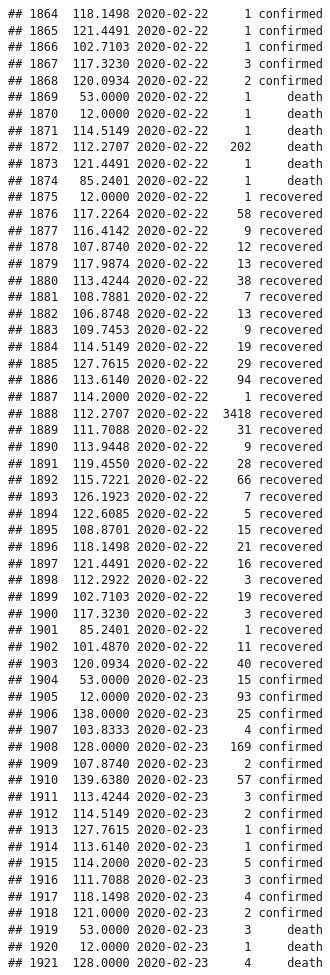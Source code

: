 \documentclass[
]{article}
\begin{document}
\begin{verbatim}
## 1864  118.1498 2020-02-22     1 confirmed
## 1865  121.4491 2020-02-22     1 confirmed
## 1866  102.7103 2020-02-22     1 confirmed
## 1867  117.3230 2020-02-22     3 confirmed
## 1868  120.0934 2020-02-22     2 confirmed
## 1869   53.0000 2020-02-22     1     death
## 1870   12.0000 2020-02-22     1     death
## 1871  114.5149 2020-02-22     1     death
## 1872  112.2707 2020-02-22   202     death
## 1873  121.4491 2020-02-22     1     death
## 1874   85.2401 2020-02-22     1     death
## 1875   12.0000 2020-02-22     1 recovered
## 1876  117.2264 2020-02-22    58 recovered
## 1877  116.4142 2020-02-22     9 recovered
## 1878  107.8740 2020-02-22    12 recovered
## 1879  117.9874 2020-02-22    13 recovered
## 1880  113.4244 2020-02-22    38 recovered
## 1881  108.7881 2020-02-22     7 recovered
## 1882  106.8748 2020-02-22    13 recovered
## 1883  109.7453 2020-02-22     9 recovered
## 1884  114.5149 2020-02-22    19 recovered
## 1885  127.7615 2020-02-22    29 recovered
## 1886  113.6140 2020-02-22    94 recovered
## 1887  114.2000 2020-02-22     1 recovered
## 1888  112.2707 2020-02-22  3418 recovered
## 1889  111.7088 2020-02-22    31 recovered
## 1890  113.9448 2020-02-22     9 recovered
## 1891  119.4550 2020-02-22    28 recovered
## 1892  115.7221 2020-02-22    66 recovered
## 1893  126.1923 2020-02-22     7 recovered
## 1894  122.6085 2020-02-22     5 recovered
## 1895  108.8701 2020-02-22    15 recovered
## 1896  118.1498 2020-02-22    21 recovered
## 1897  121.4491 2020-02-22    16 recovered
## 1898  112.2922 2020-02-22     3 recovered
## 1899  102.7103 2020-02-22    19 recovered
## 1900  117.3230 2020-02-22     3 recovered
## 1901   85.2401 2020-02-22     1 recovered
## 1902  101.4870 2020-02-22    11 recovered
## 1903  120.0934 2020-02-22    40 recovered
## 1904   53.0000 2020-02-23    15 confirmed
## 1905   12.0000 2020-02-23    93 confirmed
## 1906  138.0000 2020-02-23    25 confirmed
## 1907  103.8333 2020-02-23     4 confirmed
## 1908  128.0000 2020-02-23   169 confirmed
## 1909  107.8740 2020-02-23     2 confirmed
## 1910  139.6380 2020-02-23    57 confirmed
## 1911  113.4244 2020-02-23     3 confirmed
## 1912  114.5149 2020-02-23     2 confirmed
## 1913  127.7615 2020-02-23     1 confirmed
## 1914  113.6140 2020-02-23     1 confirmed
## 1915  114.2000 2020-02-23     5 confirmed
## 1916  111.7088 2020-02-23     3 confirmed
## 1917  118.1498 2020-02-23     4 confirmed
## 1918  121.0000 2020-02-23     2 confirmed
## 1919   53.0000 2020-02-23     3     death
## 1920   12.0000 2020-02-23     1     death
## 1921  128.0000 2020-02-23     4     death

\end{verbatim}
\end{document}
